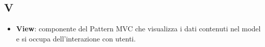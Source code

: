\subsection{V}
\begin{itemize} 
	\item
	\textbf{View}: componente del Pattern MVC che visualizza i dati contenuti nel model e si occupa dell'interazione con utenti.
\end{itemize}